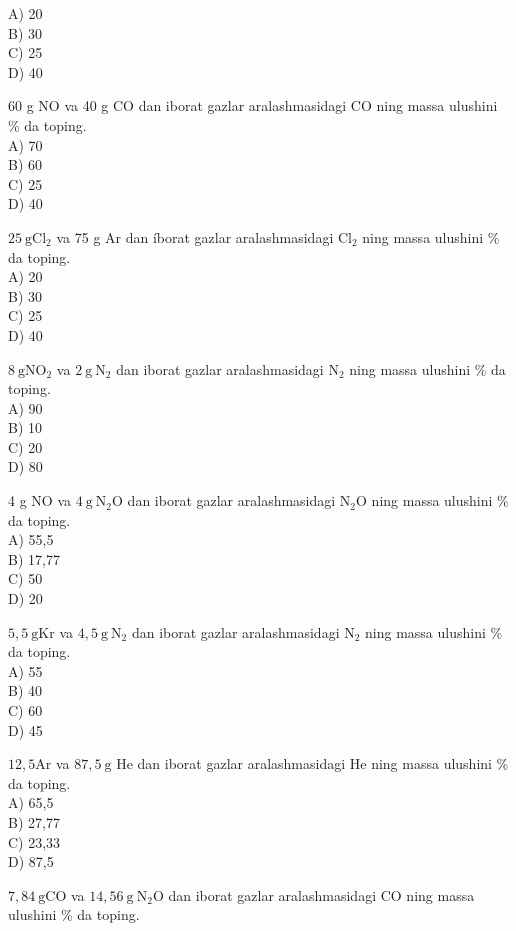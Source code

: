A) 20\\
B) 30\\
C) 25\\
D) 40
  \item 60 g NO va 40 g CO dan iborat gazlar aralashmasidagi CO ning massa ulushini \% da toping.\\
A) 70\\
B) 60\\
C) 25\\
D) 40
  \item $25 \mathrm{~g} \mathrm{Cl}_{2}$ va 75 g Ar dan íborat gazlar aralashmasidagi $\mathrm{Cl}_{2}$ ning massa ulushini \% da toping.\\
A) 20\\
B) 30\\
C) 25\\
D) 40
  \item $8 \mathrm{~g} \mathrm{NO}_{2}$ va $2 \mathrm{~g} \mathrm{~N}_{2}$ dan iborat gazlar aralashmasidagi $\mathrm{N}_{2}$ ning massa ulushini \% da toping.\\
A) 90\\
B) 10\\
C) 20\\
D) 80
  \item 4 g NO va $4 \mathrm{~g} \mathrm{~N}_{2} \mathrm{O}$ dan iborat gazlar aralashmasidagi $\mathrm{N}_{2} \mathrm{O}$ ning massa ulushini \% da toping.\\
A) 55,5\\
B) 17,77\\
C) 50\\
D) 20
  \item $5,5 \mathrm{~g} \mathrm{Kr}$ va $4,5 \mathrm{~g} \mathrm{~N}_{2}$ dan iborat gazlar aralashmasidagi $\mathrm{N}_{2}$ ning massa ulushini $\%$ da toping.\\
A) 55\\
B) 40\\
C) 60\\
D) 45
  \item $12,5 \mathrm{Ar}$ va $87,5 \mathrm{~g}$ He dan iborat gazlar aralashmasidagi He ning massa ulushini \% da toping.\\
A) 65,5\\
B) 27,77\\
C) 23,33\\
D) 87,5
  \item $7,84 \mathrm{~g} \mathrm{CO}$ va $14,56 \mathrm{~g} \mathrm{~N}_{2} \mathrm{O}$ dan iborat gazlar aralashmasidagi CO ning massa ulushini \% da toping.\\
